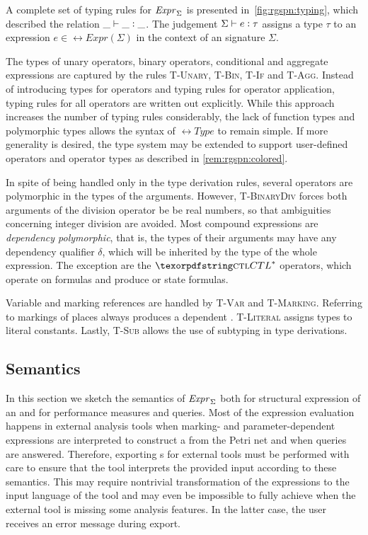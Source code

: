 A complete set of typing rules for \(\textrm{\itshape Expr\/}_\Sigma\) is presented in~\vref{fig:rgspn:typing}, which described the relation \(\_ \vdash \_ \mathrel{\vcentcolon} \_\). The judgement \(\Sigma \vdash e \mathrel{\vcentcolon} \tau\) assigns a type \(\tau\) to an expression \(e \in \rel{Expr}(\Sigma)\) in the context of an  signature \(\Sigma\). 

The types of unary operators, binary operators, conditional and aggregate expressions are captured by the rules \textsc{T-Unary}, \textsc{T-Bin}, \textsc{T-If} and \textsc{T-Agg}. Instead of introducing types for operators and typing rules for operator application, typing rules for all operators are written out explicitly. While this approach increases the number of typing rules considerably, the lack of function types and polymorphic types allows the syntax of \(\rel{Type}\) to remain simple. If more generality is desired, the type system may be extended to support user-defined operators and operator types as described in \vref{rem:rgspn:colored}.

In spite of being handled only in the type derivation rules, several operators are polymorphic in the types of the arguments. However, \textsc{T-BinaryDiv} forces both arguments of the division operator be be real numbers, so that ambiguities concerning integer division are avoided. Most compound expressions are \emph{dependency polymorphic}, that is, the types of their arguments may have any dependency qualifier \(\delta\), which will be inherited by the type of the whole expression. The exception are the \(\textabbr{CTL}^*\) operators, which operate on  formulas and produce  or  state formulas. 

Variable and marking references are handled by \textsc{T-Var} and \textsc{T-Marking}. Referring to markings of places always produces a  dependent . \textsc{T-Literal} assigns  types to literal constants. Lastly, \textsc{T-Sub} allows the use of subtyping in type derivations.

\subsection{Semantics}
\label{ssec:rgspn:semantics}

In this section we sketch the semantics of \(\textrm{\itshape Expr\/}_\Sigma\) both for structural expression of an  and for performance measures and queries. Most of the expression evaluation happens in external analysis tools when marking- and parameter-dependent expressions are interpreted to construct a  from the Petri net and when queries are answered. Therefore, exporting s for external tools must be performed with care to ensure that the tool interprets the provided input according to these semantics. This may require nontrivial transformation of the expressions to the input language of the tool and may even be impossible to fully achieve when the external tool is missing some analysis features. In the latter case, the user receives an error message during export.

